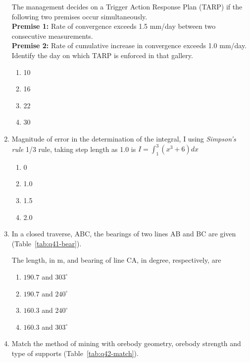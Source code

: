 \documentclass[journal]{IEEEtran}
\begin{document}
\begin{enumerate}[leftmargin=0pt]

The management decides on a Trigger Action Response Plan (TARP) if the following two premises occur simultaneously.\\[0.4em]
\textbf{Premise 1:} Rate of convergence exceeds 1.5 mm/day between two consecutive measurements.\\
\textbf{Premise 2:} Rate of cumulative increase in convergence exceeds 1.0 mm/day.\\[0.6em]
Identify the day on which TARP is enforced in that gallery.

\begin{enumerate}
  \item 10
  \item 16
  \item 22
  \item 30
\end{enumerate}

\hfill{}

\item Magnitude of error in the determination of the integral, I using \textit{Simpson's rule}
 1/3 rule, taking step length as 1.0 is
$I = \int_1^3 (x^3 + 6) dx$
\begin{enumerate}
\item 0
\item 1.0
\item 1.5
\item 2.0
\end{enumerate}
\hfill{}
\item In a closed traverse, ABC, the bearings of two lines AB and BC are given
(Table~\ref{tab:q41-bear}).


The length, in m, and bearing of line CA, in degree, respectively, are

\begin{enumerate}
\item $190.7$ and $303^\circ$
\item $190.7$ and $240^\circ$
\item $160.3$ and $240^\circ$
\item $160.3$ and $303^\circ$
\end{enumerate}
\hfill{}

\newpage
\item Match the method of mining with orebody geometry, orebody strength and type of supports
(Table~\ref{tab:q42-match}).


\end{enumerate}
\end{document}
